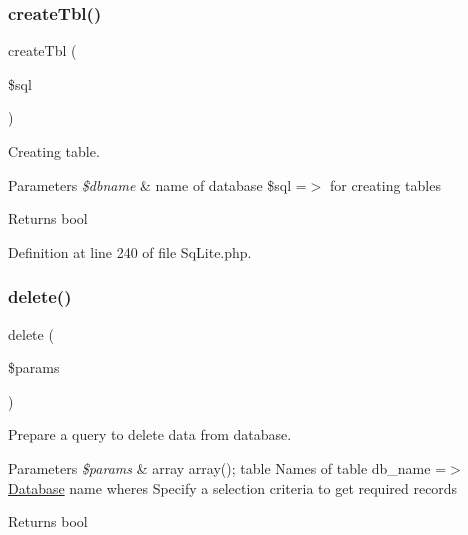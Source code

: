 \subsubsection{\texorpdfstring{create\+Tbl()}{createTbl()}}
{\footnotesize\ttfamily create\+Tbl (\begin{DoxyParamCaption}\item[{}]{\$sql }\end{DoxyParamCaption})}

Creating table.


\begin{DoxyParams}{Parameters}
{\em \$dbname} & name of database \$sql =$>$ for creating tables\\
\hline
\end{DoxyParams}
\begin{DoxyReturn}{Returns}
bool 
\end{DoxyReturn}


Definition at line 240 of file Sq\+Lite.\+php.

\mbox{\label{class_zest_1_1_database_1_1_drives_1_1_sq_lite_1_1_sq_lite_a2fb5b35138aabdbcdbabde07ff1df4b6}} 
\subsubsection{\texorpdfstring{delete()}{delete()}}
{\footnotesize\ttfamily delete (\begin{DoxyParamCaption}\item[{}]{\$params }\end{DoxyParamCaption})}

Prepare a query to delete data from database.


\begin{DoxyParams}{Parameters}
{\em \$params} & array array(); \textquotesingle{}table\textquotesingle{} Names of table \textquotesingle{}db\+\_\+name\textquotesingle{} =$>$ \mbox{\hyperlink{namespace_zest_1_1_database}{Database}} name \textquotesingle{}wheres\textquotesingle{} Specify a selection criteria to get required records\\
\hline
\end{DoxyParams}
\begin{DoxyReturn}{Returns}
bool 
\end{DoxyReturn}


